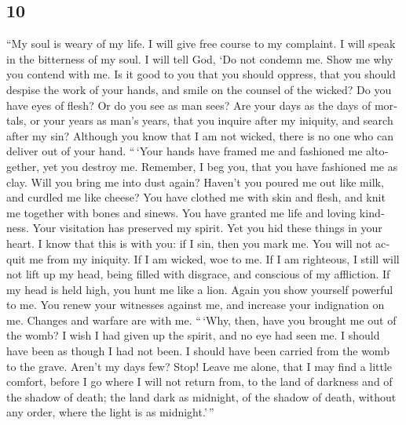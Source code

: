 \begin{paracol}{2}
\switchcolumn
\begin{otherlanguage}{english}

\hypertarget{section-19}{%
\section{10}\label{section-19}}

 ``My soul is weary of my life. I will give free course to
my complaint. I will speak in the bitterness of my soul. 
I will tell God, `Do not condemn me. Show me why you contend with me.
 Is it good to you that you should oppress, that you
should despise the work of your hands, and smile on the counsel of the
wicked?  Do you have eyes of flesh? Or do you see as man
sees?  Are your days as the days of mortals, or your years
as man's years,  that you inquire after my iniquity, and
search after my sin?  Although you know that I am not
wicked, there is no one who can deliver out of your hand. 
``\,`Your hands have framed me and fashioned me altogether, yet you
destroy me.  Remember, I beg you, that you have fashioned
me as clay. Will you bring me into dust again?  Haven't
you poured me out like milk, and curdled me like cheese? 
You have clothed me with skin and flesh, and knit me together with bones
and sinews.  You have granted me life and loving
kindness. Your visitation has preserved my spirit.  Yet
you hid these things in your heart. I know that this is with you:
 if I sin, then you mark me. You will not acquit me from
my iniquity.  If I am wicked, woe to me. If I am
righteous, I still will not lift up my head, being filled with disgrace,
and conscious of my affliction.  If my head is held high,
you hunt me like a lion. Again you show yourself powerful to me.
 You renew your witnesses against me, and increase your
indignation on me. Changes and warfare are with me. 
``\,`Why, then, have you brought me out of the womb? I wish I had given
up the spirit, and no eye had seen me.  I should have
been as though I had not been. I should have been carried from the womb
to the grave.  Aren't my days few? Stop! Leave me alone,
that I may find a little comfort,  before I go where I
will not return from, to the land of darkness and of the shadow of
death;  the land dark as midnight, of the shadow of
death, without any order, where the light is as midnight.'\,''


\end{otherlanguage}
\end{paracol}
